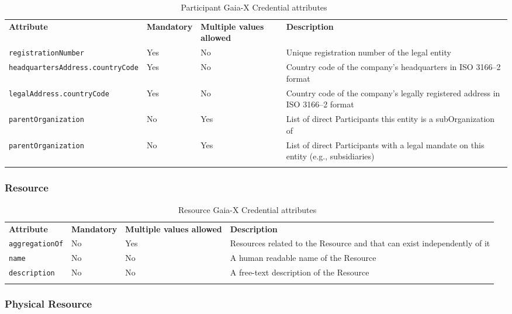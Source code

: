 \begin{longtable}{ |p{4cm}|p{2cm}|p{2cm}|p{7cm}| }
    \hhline{----}
    \textbf{Attribute} & \textbf{Mandatory} & \textbf{Multiple values allowed} & \textbf{Description}\\
    \hhline{----}
    \texttt{registrationNumber} & Yes & No & Unique registration number of the legal entity\\
    \hhline{----}
    \texttt{headquartersAddress.countryCode} & Yes & No & Country code of the company's headquarters in ISO 3166--2 format\\
    \hhline{----}
    \texttt{legalAddress.countryCode} & Yes & No & Country code of the company's legally registered address in ISO 3166--2 format\\
    \hhline{----}
    \texttt{parentOrganization} & No & Yes & List of direct Participants this entity is a subOrganization of\\
    \hhline{----}
    \texttt{parentOrganization} & No & Yes & List of direct Participants with a legal mandate on this entity (e.g., subsidiaries)\\
    \hhline{----}
    \caption{Participant Gaia-X Credential attributes~\cite{gaiax_trust_framework}}
    \label{tab:participant}
\end{longtable}

\subsubsection{Resource}

\begin{longtable}{ |p{4cm}|p{2cm}|p{2cm}|p{7cm}| }
    \hhline{----}
    \textbf{Attribute} & \textbf{Mandatory} & \textbf{Multiple values allowed} & \textbf{Description}\\
    \hhline{----}
    \texttt{aggregationOf} & No & Yes & Resources related to the Resource and that can exist independently of it\\
    \hhline{----}
    \texttt{name} & No & No & A human readable name of the Resource\\
    \hhline{----}
    \texttt{description} & No & No & A free-text description of the Resource\\
    \hhline{----}
    \caption{Resource Gaia-X Credential attributes~\cite{gaiax_trust_framework}}
    \label{tab:resource}
\end{longtable}

\subsubsection{Physical Resource}

